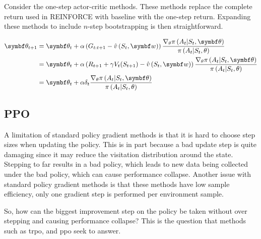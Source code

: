 Consider the one-step actor-critic methods. These methods replace the complete return used in REINFORCE with baseline with the one-step return. Expanding these methods to include $n$-step bootstrapping is then straightforward.

\begin{align}
  \nd{\theta_{t+1}} &= \nd{\theta_t} + \alpha \left(G_{t:t+1} - \hat{v}\left(S_t, \nd{w}\right)\right) \frac{\nabla_\theta \pi\left(A_t|S_t, \nd{\theta}\right)}{\pi\left(A_t|S_t,\theta\right)}\\
  &= \nd{\theta_t} + \alpha \left(R_{t+1} + \gamma V_t(S_{t+1}) - \hat{v}\left(S_t, \nd{w}\right)\right) \frac{\nabla_\theta \pi\left(A_t|S_t, \nd{\theta}\right)}{\pi\left(A_t|S_t,\theta\right)}\\
  &= \nd{\theta_t} + \alpha \delta_t \frac{\nabla_\theta \pi\left(A_t|S_t, \nd{\theta}\right)}{\pi\left(A_t|S_t,\theta\right)}
  \label{eq:actor-critic_1}
\end{align}



\subsection{PPO}
\label{sec:ppo_algo}
A limitation of standard policy gradient methods is that it is hard to choose step sizes when updating the policy. This is in part because a bad update step is quite damaging since it may reduce the visitation distribution around the state. Stepping to far results in a bad policy, which leads to new data being collected under the bad policy, which can cause performance collapse. Another issue with standard policy gradient methods is that these methods have low sample efficiency, only one gradient step is performed per environment sample\cite{schulman2017proximal, schulman2015trust}.

So, how can the biggest improvement step on the policy be taken without over stepping and causing performance collapse? This is the question that methods such as \acrfull{trpo}, and \acrfull{ppo} seek to answer.



